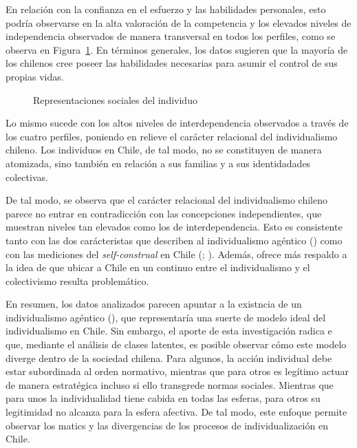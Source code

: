 \documentclass[
  letterpaper,
  DIV=11,
  numbers=noendperiod]{scrartcl}
\makeatletter
\newcommand*\pandocbounded[1]{%
  \sbox\pandoc@box{#1}%
  \Gscale@div\@tempa{\textheight}{\dimexpr\ht\pandoc@box+\dp\pandoc@box\relax}%
  \Gscale@div\@tempb{\linewidth}{\wd\pandoc@box}%
  \ifdim\@tempb\p@<\@tempa\p@\let\@tempa\@tempb\fi%
  \ifdim\@tempa\p@<\p@\scalebox{\@tempa}{\usebox\pandoc@box}%
  \else\usebox{\pandoc@box}%
  \fi%
}
\makeatother
\begin{document}
En relación con la confianza en el esfuerzo y las habilidades
personales, esto podría observarse en la alta valoración de la
competencia y los elevados niveles de independencia observados de manera
transversal en todos los perfiles, como se observa en
Figura~\ref{fig-concepciones}. En términos generales, los datos sugieren
que la mayoría de los chilenos cree poseer las habilidades necesarias
para asumir el control de sus propias vidas.

\begin{figure}[H]

\centering{

\pandocbounded{\texttt{[image: paper\_files/figure-pdf/fig-concepciones-1.pdf]}}

}

\caption{\label{fig-concepciones}Representaciones sociales del
individuo}

\end{figure}%

Lo mismo sucede con los altos niveles de interdependencia observados a
través de los cuatro perfiles, poniendo en relieve el carácter
relacional del individualismo chileno. Los individuos en Chile, de tal
modo, no se constituyen de manera atomizada, sino también en relación a
sus familias y a sus identidadades colectivas.

De tal modo, se observa que el carácter relacional del individualismo
chileno parece no entrar en contradicción con las concepciones
independientes, que muestran niveles tan elevados como los de
interdependencia. Esto es consistente tanto con las dos carácteristas
que describen al individualismo agéntico
() como con las
mediciones del \emph{self-construal} en Chile
(;
). Además, ofrece
más respaldo a la idea de que ubicar a Chile en un continuo entre el
individualismo y el colectivismo resulta problemático.

En resumen, los datos analizados parecen apuntar a la existncia de un
individualismo agéntico (), que representaría una suerte de modelo ideal del individualismo
en Chile. Sin embargo, el aporte de esta investigación radica e que,
mediante el análisis de clases latentes, es posible observar cómo este
modelo diverge dentro de la sociedad chilena. Para algunos, la acción
individual debe estar subordinada al orden normativo, mientras que para
otros es legítimo actuar de manera estratégica incluso si ello
transgrede normas sociales. Mientras que para unos la individualidad
tiene cabida en todas las esferas, para otros su legitimidad no alcanza
para la esfera afectiva. De tal modo, este enfoque permite observar los
matics y las divergencias de los procesos de individualización en Chile.
\end{document}
